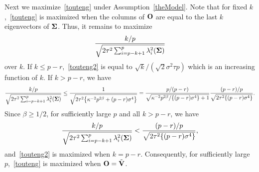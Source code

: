 \documentclass[times,sort&compress,3p]{elsarticle}
\theoremstyle{plain}
\theoremstyle{definition}
\theoremstyle{remark}
\begin{document}
Next we maximize~\eqref{touteng} under Assumption~\ref{theModel}. Note that for fixed $k$,~\eqref{touteng} is maximized when the columns of $\mathbf{O}$ are equal to the last $k$ eigenvectors of $\boldsymbol{\Sigma}$.
Thus, it remains to maximize
\begin{equation}\label{touteng2}
\frac{k/p}{\sqrt{2\tau^2\sum_{i=p-k+1}^p \lambda_i^2 (\boldsymbol{\Sigma})}}
\end{equation}
over $k$.
If $k\leq p-r$,~\eqref{touteng2} is equal to $\sqrt{k}/(\sqrt{2} \sigma^2 \tau p)$ which is an increasing function of $k$.
If $k> p-r$, we have
\begin{equation*}
        \frac{k/p}{\sqrt{2\tau^2\sum_{i=p-k+1}^p \lambda_i^2(\boldsymbol{\Sigma})}}
        \leq
        \frac{1}{\sqrt{2\tau^2\big\{\kappa^{-2}p^{2\beta}+(p-r)\sigma^4\big\} }}
        =
        \frac{p/(p-r)}{\sqrt{\kappa^{-2}p^{2\beta}/\{(p-r)\sigma^4\}+1}}
        \frac{(p-r)/p}{\sqrt{2\tau^2 \{(p-r)\sigma^4 \} }}.
\end{equation*}
Since $\beta\geq 1/2$, for sufficiently large $p$ and all $k>p-r$, we have
\begin{equation*}
        \frac{k/p}{\sqrt{2\tau^2\sum_{i=p-k+1}^p \lambda_i^2(\boldsymbol{\Sigma})}}
        <
        \frac{(p-r)/p}{\sqrt{2\tau^2 \{(p-r)\sigma^4\} }},
\end{equation*}
and~\eqref{touteng2} is maximized when $k=p-r$.
Consequently, for sufficiently large $p$,~\eqref{touteng} is maximized when $\mathbf{O}=\tilde{\mathbf{V}}$.
\end{document}
